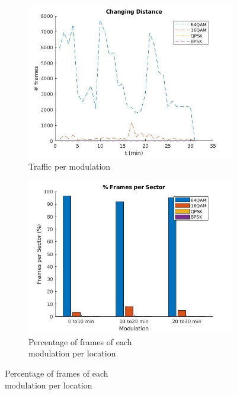 \documentclass[12]{article}
\begin{document}
\begin{figure}[!htb]
\hspace*{-3cm}
\begin{subfigure}{.5\textwidth}
  \centering
  \includegraphics[width=\linewidth]{"measurement 2/n_test11"}
  \caption{Traffic per modulation}
  \label{fig:n_meas2_sub1}
\end{subfigure}%
\hspace*{-0.6cm}
\begin{subfigure}{.5\textwidth}
  \includegraphics[width=\linewidth]{"measurement 2/n_test22"}
  \caption{Percentage of frames of each\\ modulation per location}
  \label{fig:n_meas2_sub2}
\end{subfigure}%

\end{figure}
\end{document}

